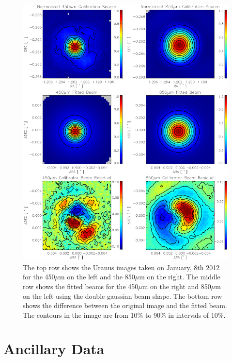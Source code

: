 \begin{figure}
  \centering
  \includegraphics[width=1.\textwidth, trim={0 5cm 0 0}]{obs_imgs/calib_beams.eps}
  \caption[SCUBA-2 Calibration and Beams]{The top row shows the Uranus images taken on January, 8th 2012 for the 450$\mu$m on the left and the 850$\mu$m on the right.  The middle row shows the fitted beams for the 450$\mu$m on the right and 850$\mu$m on the left using the double gaussian beam shape. The bottom row shows the difference between the original image and the fitted beam.  The contours in the image are from 10\% to 90\% in intervals of 10\%.}
    \label{fig_calib}
\end{figure}

\section{Ancillary Data}

